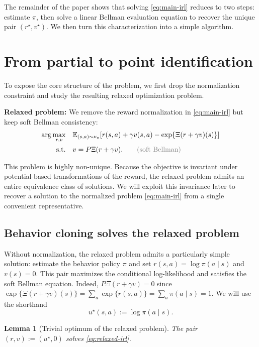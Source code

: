 \documentclass{article}
\newtheorem{lemma}{Lemma}
\newcommand{\E}{\mathbb{E}}
\newcommand{\1}{\mathbbm{1}}
\begin{document}
 

The remainder of the paper shows that solving \eqref{eq:main-irl} reduces to two steps: estimate \(\pi\), then solve a linear Bellman evaluation equation to recover the unique pair \((r^\star, v^\star)\). We then turn this characterization into a simple algorithm.


\section{From partial to point identification}
\label{sec:char}

To expose the core structure of the problem, we first drop the normalization constraint and study the resulting relaxed optimization problem.

\textbf{Relaxed problem:} We remove the reward normalization in
\eqref{eq:main-irl} but keep soft Bellman consistency:
\begin{equation}
\label{eq:relaxed-irl}
\begin{aligned}
\arg\max_{r,v}\quad
& \E_{(s,a) \sim \nu_{\pi}}\!\left[
  r(s,a) + \gamma v(s,a) - \exp\{\Xi(r+\gamma v)(s)\}
\right] \\
\text{s.t.}\quad
& v = P\Xi(r+\gamma v).
\qquad {\color{gray}(\text{soft Bellman})}
\end{aligned}
\end{equation}

This problem is highly non-unique. Because the objective is invariant under
potential-based transformations of the reward, the relaxed problem admits an
entire equivalence class of solutions. We will exploit this invariance later to
recover a solution to the normalized problem \eqref{eq:main-irl} from a single
convenient representative.

\subsection{Behavior cloning solves the relaxed problem}
\label{sec:easy-solution}

Without normalization, the relaxed problem admits a particularly simple
solution: estimate the behavior policy \(\pi\)  and set
\(r(s,a)=\log \pi(a\mid s)\) and \(v(s)=0\). This pair maximizes the
conditional log-likelihood and satisfies the soft Bellman equation. Indeed, $P\Xi(r+\gamma v) = 0$ since $\exp \{\Xi(r+\gamma v)(s)\} = \sum_a \exp\{r(s,a)\}
=
\sum_a \pi(a\mid s)
=
1.$
We will use the shorthand
\[
u^\star(s,a):=\log \pi(a\mid s).
\]
\begin{lemma}[Trivial optimum of the relaxed problem]
\label{lem:trivial}
The pair \((r,v) := (u^\star,0)\) solves \eqref{eq:relaxed-irl}.
\end{lemma}
\end{document}
